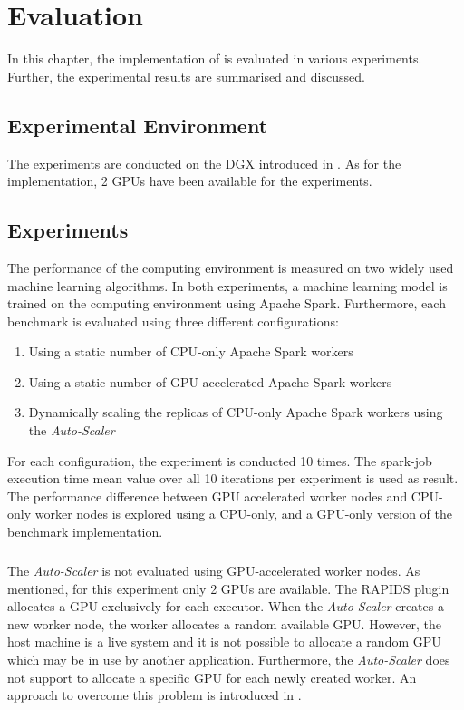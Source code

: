 \chapter{Evaluation}
\label{chap:07_evaluation}

In this chapter, the implementation of  is evaluated in various experiments. Further, the experimental results are summarised and discussed.

\section{Experimental Environment}
%
The experiments are conducted on the DGX introduced in .
As for the implementation, 2 GPUs have been available for the experiments.


\section{Experiments}
The performance of the computing environment is measured on two widely used machine learning algorithms.
In both experiments, a machine learning model is trained on the computing environment using Apache Spark. Furthermore, each benchmark is evaluated using three different configurations:
\begin{enumerate}
\item Using a static number of CPU-only Apache Spark workers
\item Using a static number of GPU-accelerated Apache Spark workers
\item Dynamically scaling the replicas of CPU-only Apache Spark workers using the \textit{Auto-Scaler}
\end{enumerate}
For each configuration, the experiment is conducted 10 times. The spark-job execution time mean value over all 10 iterations per experiment is used as result.
The performance difference between GPU accelerated worker nodes and CPU-only worker nodes is explored using a CPU-only, and a GPU-only version of the benchmark implementation.

\paragraph{}
The \textit{Auto-Scaler} is not evaluated using GPU-accelerated worker nodes. As mentioned, for this experiment only 2 GPUs are available. The RAPIDS plugin allocates a GPU exclusively for each executor. When the \textit{Auto-Scaler} creates a new worker node, the worker allocates a random available GPU.
However, the host machine is a live system and it is not possible to allocate a random GPU which may be in use by another application. Furthermore, the \textit{Auto-Scaler} does not support to allocate a specific GPU for each newly created worker. An approach to overcome this problem is introduced in .


